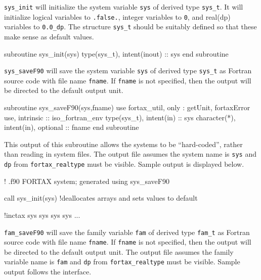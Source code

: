 \documentclass[11pt,thmsa,letter,ukenglish]{article}
\begin{document}
\noindent\texttt{sys\_init} will initialize the system variable \texttt{sys} of derived type \texttt{sys\_t}. It will initialize logical variables to \texttt{.false.}, integer variables to \texttt{0}, and real(dp) variables to \texttt{0.0\_dp}. The structure \texttt{sys\_t} should be suitably defined so that these make sense as default values.

\begin{fortrancode}
subroutine sys_init(sys)
    type(sys_t), intent(inout) :: sys
end subroutine
\end{fortrancode}

\noindent\texttt{sys\_saveF90} will save the system variable \texttt{sys} of derived type \texttt{sys\_t} as Fortran source code with file name \texttt{fname}. If \texttt{fname} is not specified, then the output will be directed to the default output unit.

\begin{fortrancode}
subroutine sys_saveF90(sys,fname)
  use fortax_util, only : getUnit, fortaxError
  use, intrinsic :: iso_fortran_env
  type(sys_t),  intent(in) :: sys
  character(*), intent(in), optional :: fname
end subroutine
\end{fortrancode}

This output of this subroutine allows the systems to be ``hard-coded'', rather than reading in system files. The output file assumes the system name is \texttt{sys} and \texttt{dp} from \texttt{fortax\_realtype} must be visible. Sample output is displayed below.

\begin{fortrancode}[title={Extract from \texttt{sys\_saveF90} output},frame=lines]
! .f90 FORTAX system; generated using sys_saveF90

call sys_init(sys) !deallocates arrays and sets values to default

!inctax
sys%
sys%
sys%
sys%
...
\end{fortrancode}

\noindent\texttt{fam\_saveF90} will save the family variable \texttt{fam} of derived type \texttt{fam\_t} as Fortran source code with file name \texttt{fname}. If \texttt{fname} is not specified, then the output will be directed to the default output unit. The output file assumes the family variable name is \texttt{fam} and \texttt{dp} from \texttt{fortax\_realtype} must be visible. Sample output follows the interface.
\end{document}
